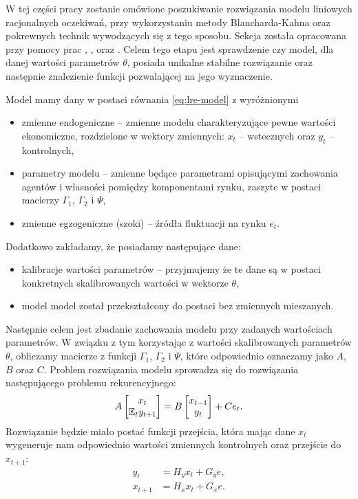 W tej części pracy zostanie omówione poszukiwanie rozwiązania modelu liniowych racjonalnych oczekiwań, przy wykorzystaniu metody Blancharda-Kahna oraz pokrewnych technik wywodzących się z tego sposobu. Sekcja została opracowana przy pomocy prac \cite{10.2307/1912186}, \cite{King1998TheSO}, \cite{RePEc:cpm:dynare:002} oraz \cite{KLEIN20001405}. Celem tego etapu jest sprawdzenie czy model, dla danej wartości parametrów $\theta$, posiada unikalne stabilne rozwiązanie oraz następnie znalezienie funkcji pozwalającej na jego wyznaczenie.

Model mamy dany w postaci równania \eqref{eq:lre-model} z wyróżnionymi
\begin{itemize}
    \item zmienne endogeniczne -- zmienne modelu charakteryzujące pewne wartości ekonomiczne, rozdzielone w wektory zmiennych: $x_t$ -- wstecznych oraz $y_t$ -- kontrolnych,
    \item parametry modelu -- zmienne będące parametrami opisującymi zachowania agentów i własności pomiędzy komponentami rynku, zaszyte w postaci macierzy $\Gamma_1$, $\Gamma_2$ i $\Psi$,
    \item zmienne egzogeniczne (szoki) -- źródła fluktuacji na rynku $e_t$.
\end{itemize}
Dodatkowo zakładamy, że posiadamy następujące dane:
\begin{itemize}
    \item kalibracje wartości parametrów -- przyjmujemy że te dane są w postaci konkretnych skalibrowanych wartości w wektorze $\theta$,
    \item model model został przekształcony do postaci bez zmiennych mieszanych.
\end{itemize}
Następnie celem jest zbadanie zachowania modelu przy zadanych wartościach parametrów. W związku z tym korzystając z wartości skalibrowanych parametrów $\theta$, obliczamy macierze z funkcji $\Gamma_1$, $\Gamma_2$ i $\Psi$, które odpowiednio oznaczamy jako $A$, $B$ oraz $C$. Problem rozwiązania modelu sprowadza się do rozwiązania następującego problemu rekurencyjnego:
\begin{equation}
    \label{eqn:lreEquation}
    A \begin{bmatrix}
    x_{t} \\
    \mathbb{E}_t y_{t+1}
\end{bmatrix} = B \begin{bmatrix}
    x_{t-1} \\
    y_{t}
\end{bmatrix} + C e_t.
\end{equation}
Rozwiązanie będzie miało postać funkcji przejścia, która mając dane $x_t$ wygeneruje nam odpowiednio wartości zmiennych kontrolnych oraz przejście do $x_{t+1}$:
\begin{align}
\label{eqn:bkproblem}
    y_t &= H_y x_t + G_y e,\\
    x_{t+1} &= H_x x_t + G_x e. \nonumber
\end{align}

